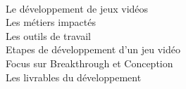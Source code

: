 \begin{introduction}


 \\
Le développement de jeux vidéos \\
Les métiers impactés \\
Les outils de travail \\
Etapes de développement d'un jeu vidéo \\
Focus sur Breakthrough et Conception \\
Les livrables du développement \\
\end{introduction}

